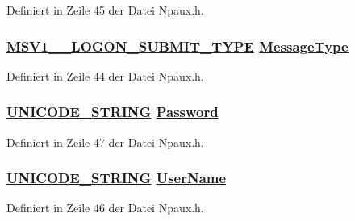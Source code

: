 Definiert in Zeile 45 der Datei Npaux.h.\hypertarget{struct__MSV1__0__INTERACTIVE__LOGON___MSV1__0__INTERACTIVE__LOGONo0}{
\subsubsection[MessageType]{\setlength{\rightskip}{0pt plus 5cm}\hyperlink{Npaux_8h_a5}{MSV1\_\_\-LOGON\_\-SUBMIT\_\-TYPE} \hyperlink{struct__MSV1__0__INTERACTIVE__LOGON___MSV1__0__INTERACTIVE__LOGONo0}{Message\-Type}}}
\label{struct__MSV1__0__INTERACTIVE__LOGON___MSV1__0__INTERACTIVE__LOGONo0}




Definiert in Zeile 44 der Datei Npaux.h.\hypertarget{struct__MSV1__0__INTERACTIVE__LOGON___MSV1__0__INTERACTIVE__LOGONo3}{
\subsubsection[Password]{\setlength{\rightskip}{0pt plus 5cm}\hyperlink{struct__UNICODE__STRING}{UNICODE\_\-STRING} \hyperlink{struct__MSV1__0__INTERACTIVE__LOGON___MSV1__0__INTERACTIVE__LOGONo3}{Password}}}
\label{struct__MSV1__0__INTERACTIVE__LOGON___MSV1__0__INTERACTIVE__LOGONo3}




Definiert in Zeile 47 der Datei Npaux.h.\hypertarget{struct__MSV1__0__INTERACTIVE__LOGON___MSV1__0__INTERACTIVE__LOGONo2}{
\subsubsection[UserName]{\setlength{\rightskip}{0pt plus 5cm}\hyperlink{struct__UNICODE__STRING}{UNICODE\_\-STRING} \hyperlink{struct__MSV1__0__INTERACTIVE__LOGON___MSV1__0__INTERACTIVE__LOGONo2}{User\-Name}}}
\label{struct__MSV1__0__INTERACTIVE__LOGON___MSV1__0__INTERACTIVE__LOGONo2}




Definiert in Zeile 46 der Datei Npaux.h.